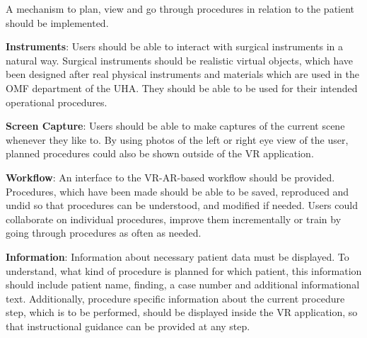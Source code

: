 \begin{compactenum}[label=(F \arabic*)]
\begin{compactenum}[label=(F 3.\arabic*)]
        \item \label{req::F3.7}A mechanism to plan, view and go through procedures in relation to the patient should be implemented.  
    \end{compactenum}
    \item \label{req::F4}\textbf{Instruments}: Users should be able to interact with surgical instruments in a natural way.
    Surgical instruments should be realistic virtual objects, which have been designed after real physical instruments and materials which are used in the OMF department of the UHA.
    They should be able to be used for their intended operational procedures.
    \item \label{req::F5}\textbf{Screen Capture}: Users should be able to make captures of the current scene whenever they like to.
    By using photos of the left or right eye view of the user, planned procedures could also be shown outside of the VR application. 
    \item \label{req::F6}\textbf{Workflow}: An interface to the VR-AR-based workflow should be provided.
    Procedures, which have been made should be able to be saved, reproduced and undid so that procedures can be understood, and modified if needed.
    Users could collaborate on individual procedures, improve them incrementally or train by going through procedures as often as needed.
    \item \label{req::F7}\textbf{Information}: Information about necessary patient data must be displayed.
    To understand, what kind of procedure is planned for which patient, this information should include patient name, finding, a case number and additional informational text.
    Additionally, procedure specific information about the current procedure step, which is to be performed, should be displayed inside the VR application, so that instructional guidance can 
    be provided at any step.
\end{compactenum}